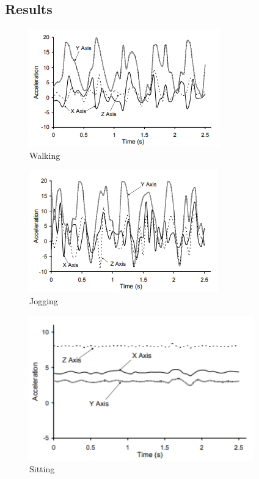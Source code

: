 \documentclass[conference]{IEEEtran}
\begin{document}
\subsection{Results}
\begin{figure}[!htb]
  \includegraphics[width=\linewidth]{walking.png}
  \caption{Walking}
  \label{fig:walking}
\end{figure}
\begin{figure}[!htb]
  \includegraphics[width=\linewidth]{jogging.png}
  \caption{Jogging}
  \label{fig:jogging}
\end{figure}
\begin{figure}[!htb]
  \includegraphics[width=\linewidth]{sitting.png}
  \caption{Sitting}
  \label{fig:sitting}
\end{figure}
\end{document}
